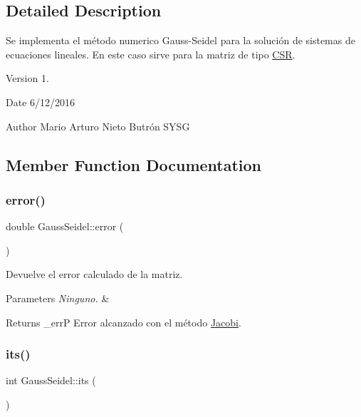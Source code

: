 \subsection{Detailed Description}
Se implementa el método numerico Gauss-\/\+Seidel para la solución de sistemas de ecuaciones lineales. En este caso sirve para la matriz de tipo \hyperlink{class_c_s_r}{C\+SR}. 

\begin{DoxyVersion}{Version}
1. 
\end{DoxyVersion}
\begin{DoxyDate}{Date}
6/12/2016 
\end{DoxyDate}
\begin{DoxyAuthor}{Author}
Mario Arturo Nieto Butrón  S\+Y\+SG 
\end{DoxyAuthor}


\subsection{Member Function Documentation}
\hypertarget{class_gauss_seidel_ae78a52240f0d1a67e08a0ac280f87d95}{}\label{class_gauss_seidel_ae78a52240f0d1a67e08a0ac280f87d95} 
\subsubsection{\texorpdfstring{error()}{error()}}
{\footnotesize\ttfamily double Gauss\+Seidel\+::error (\begin{DoxyParamCaption}{ }\end{DoxyParamCaption})\hspace{0.3cm}{\ttfamily [inline]}}



Devuelve el error calculado de la matriz. 


\begin{DoxyParams}{Parameters}
{\em Ninguno.} & \\
\hline
\end{DoxyParams}
\begin{DoxyReturn}{Returns}
\+\_\+errP Error alcanzado con el método \hyperlink{class_jacobi}{Jacobi}. 
\end{DoxyReturn}
\hypertarget{class_gauss_seidel_af6e2a4215cc0127b156269ee65e2d5a3}{}\label{class_gauss_seidel_af6e2a4215cc0127b156269ee65e2d5a3} 
\subsubsection{\texorpdfstring{its()}{its()}}
{\footnotesize\ttfamily int Gauss\+Seidel\+::its (\begin{DoxyParamCaption}{ }\end{DoxyParamCaption})\hspace{0.3cm}{\ttfamily [inline]}}



